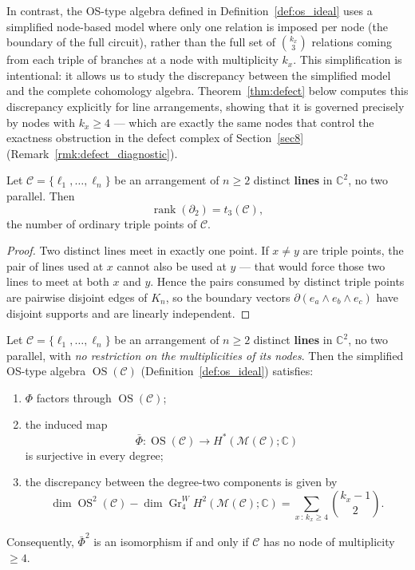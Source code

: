 \documentclass[article,11pt]{amsart} \numberwithin{equation}{section}
\numberwithin{equation}{section}
\begin{document}
{\begin{rk}
	In contrast, the OS-type algebra defined in Definition~\ref{def:os_ideal}
	uses a simplified node-based model where only one relation is imposed
	per node (the boundary of the full circuit), rather than the full set of
	$\binom{k_x}{3}$ relations coming from each triple of branches at a node
	with multiplicity $k_x$. This simplification is intentional: it allows
	us to study the discrepancy between the simplified model and the
	complete cohomology algebra. Theorem~\ref{thm:defect} below computes this
	discrepancy explicitly for line arrangements, showing that it is
	governed precisely by nodes with $k_x\ge4$ — which are exactly the
	same nodes that control the exactness obstruction in the defect
	complex of Section~\ref{sec8} (Remark~\ref{rmk:defect_diagnostic}).
\end{rk}


\begin{lm}\label{lem:rank2}
	Let $\mathcal{C}=\{\ell_1,\dots,\ell_n\}$ be an arrangement of $n\geq 2$ distinct
	\textbf{lines} in $\mathbb{C}^2$, no two parallel. Then
	$$\operatorname{rank}(\partial_2) = t_3(\mathcal{C}),$$
	the number of ordinary triple points of $\mathcal{C}$.
\end{lm}

\begin{proof}
	Two distinct lines meet in exactly one point. If $x\neq y$ are triple points, the pair of
	lines used at $x$ cannot also be used at $y$ — that would force those two lines to meet
	at both $x$ and $y$. Hence the pairs consumed by distinct triple points are pairwise
	disjoint edges of $K_n$, so the boundary vectors $\partial(e_a\wedge e_b\wedge e_c)$ have
	disjoint supports and are linearly independent.
\end{proof}

\begin{thm}
	\label{thm:defect}
	Let $\mathcal C=\{\ell_1,\dots,\ell_n\}$ be an arrangement of $n\ge2$ distinct
	\textbf{lines} in $\mathbb C^2$, no two parallel, with \emph{no restriction on the
		multiplicities of its nodes}. Then the simplified OS-type algebra
	$\operatorname{OS}(\mathcal C)$ (Definition~\ref{def:os_ideal}) satisfies:
	\begin{enumerate}
		\item $\Phi$ factors through $\operatorname{OS}(\mathcal C)$;
		\item the induced map 
		\[
		\bar\Phi:\operatorname{OS}(\mathcal C)\longrightarrow H^*(\mathcal M(\mathcal C);\mathbb C)
		\]
		is surjective in every degree;
		\item the discrepancy between the degree-two components is given by
		\[
		\dim \operatorname{OS}^2(\mathcal C)-\dim \operatorname{Gr}^W_4 H^2(\mathcal M(\mathcal C);\mathbb C)
		=\sum_{x\,:\,k_x\ge4}\binom{k_x-1}{2}. \tag{$\star$}
		\]
	\end{enumerate}
	Consequently, $\bar\Phi^2$ is an isomorphism if and only if $\mathcal C$ has no node of
	multiplicity $\ge4$.
\end{thm}

}
\end{document}
